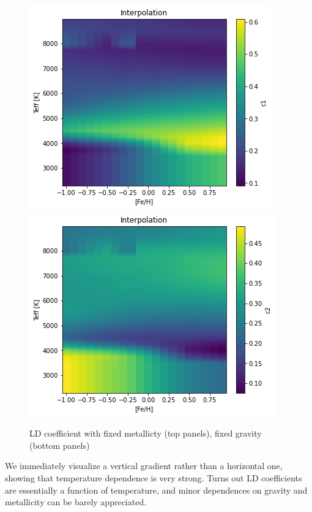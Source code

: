 \documentclass[a4paper,11pt,twocolumn]{article}
\begin{document}
\begin{figure}[H]
    \includegraphics[scale=0.5, angle=0]{../pictures/Claret2017/2017_c1_fixedg}
    \includegraphics[scale=0.5, angle=0]{../pictures/Claret2017/2017_c2_fixedg}
    \caption{LD coefficient with fixed metallicty (top panels), fixed gravity (bottom panels)}
\end{figure}
We immediately visualize a vertical gradient rather than a horizontal one,
showing that temperature dependence is very strong. Turns out LD 
coefficients are essentially a function of temperature, and minor 
dependences on gravity and metallicity can be barely appreciated.
\end{document}

